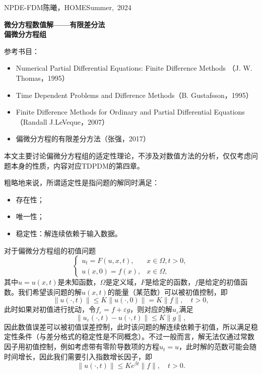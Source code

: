 \documentclass[a4paper,10pt]{ctexart}
\begin{document}
\hfill\vbox{\hbox{NPDE-FDM}\hbox{陈曦，HOME}\hbox{Summer, 2024}}

\begin{center}\Large
    \textbf{微分方程数值解——有限差分法}\\{\normalsize\bf {偏微分方程组}}
\end{center}
\vskip 30pt
\small {参考书目：
\begin{itemize}
    \item Numerical Partial Differential Equations: Finite Difference Methods （J. W. Thomas，1995）
    \item Time Dependent Problems and Difference Methods（B. Gustafsson，1995）
    \item Finite Difference Methods for Ordinary and Partial Differential Equations（Randall J.LeVeque，2007）
    \item 偏微分方程的有限差分方法（张强，2017）
\end{itemize}}
本文主要讨论偏微分方程组的适定性理论，不涉及对数值方法的分析，仅仅考虑问题本身的性质，内容对应TDPDM的第四章。

粗略地来说，所谓适定性是指问题的解同时满足：
\begin{itemize}
    \item 存在性；
    \item 唯一性；
    \item 稳定性：解连续依赖于输入数据。
\end{itemize}
对于偏微分方程组的初值问题
\begin{equation}\label{eq:pde}
    \begin{cases}
        u_t = F(u,x,t), &x\in\Omega, t>0,\\
        u(x,0) = f(x), &x\in\Omega,
    \end{cases}
\end{equation}
其中$ u = u(x,t) $是未知函数，$ \Omega $是定义域，$ F $是给定的函数，$ f $是给定的初值函数。我们希望该问题的解$ u(x,t) $的能量（某范数）可以被初值控制，即
\[
    \| u(\cdot,t) \| \leqslant K \| u(\cdot,0) \| = K \| f \| ,\quad t>0,
\]
此时如果对初值进行扰动，令$ f_\varepsilon = f + \varepsilon g $，则对应的解$ u_\varepsilon $满足
\[
    \| u_\varepsilon(\cdot,t) - u(\cdot,t) \| \leqslant K \| g \|,  
\]
因此数值误差可以被初值误差控制，此时该问题的解连续依赖于初值，所以满足稳定性条件（与差分格式的稳定性是不同概念）。不过一般而言，解无法仅通过常数因子用初值控制，例如考虑带有零阶导数项的方程$ u_t=u $，此时解的范数可能会随时间增长，因此我们需要引入指数增长因子，即
\begin{equation}
    \| u(\cdot,t) \| \leqslant Ke^{\beta t} \| f \|, \quad t>0.
\end{equation}
\end{document}
